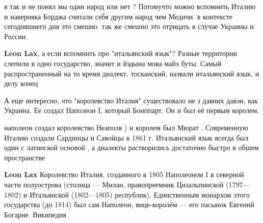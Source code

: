 \begin{itemize}
я так и не понял мы один народ или нет ? Потомучто можно вспомнить Италию и
наверняка Борджа считали себя другим народ чем Медичи. в контексте сегодняшнего
дня это смешно. так же смешно это отрицать в случае Украины и России.

\begin{itemize}
 
\textbf{Leon Lax}, а если вспомнить про "итальянский язык"? Разные территории слепили в одно государство, значит и йэдына мова майэ буты. Самый распространенный на то время диалект, тосканский, назвали итальянский язык, и делу конец

 
А еще интересно, что "королевство Италия" существовало не з давних давэн, как Украина. Ее создал Наполеон I, который Бонппарт. Он и был её первым королем.

 
наполеон создал королевство Неаполя ) и королем был Мюрат . Современную Италию создали Сардинцы и Савойцы в 1861 г. Итальянский язык всегда был один с латинской основой , а диалекты растворились достаточно быстро в обшем пространстве

 
\textbf{Leon Lax} Королевство Италия, созданного в 1805 Наполеоном I в северной части полуострова (столица — Милан, правопреемник Цизальпинской (1797—1802) и Итальянской (1802—1805) республик). Единственным монархом этого государства (до 1814) был сам Наполеон, вице-королём — его пасынок Евгений Богарне.
Википедия

 

\end{itemize}
\end{itemize}
